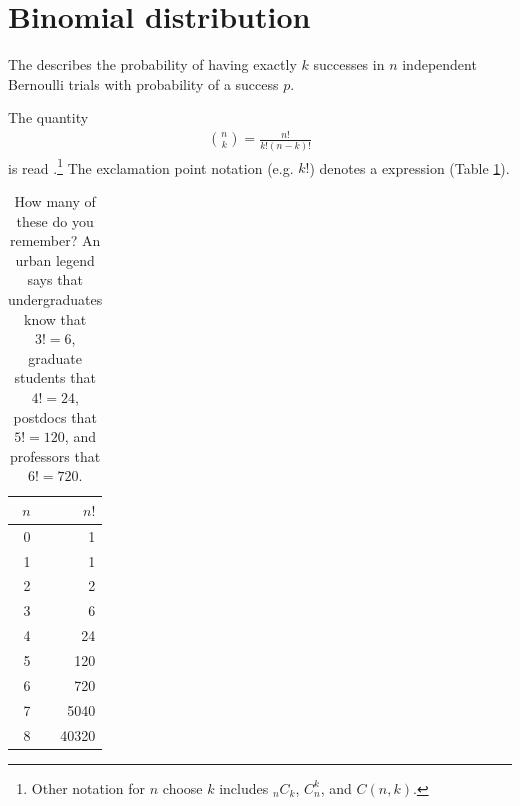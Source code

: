 \section{Binomial distribution}
\label{binomialModel}






The  describes the probability of having exactly $k$ successes in $n$ independent Bernoulli trials with probability of a success $p$.

The quantity
\begin{eqnarray*}
{n\choose k} = \frac{n!}{k!(n-k)!}
\end{eqnarray*}
is read .\footnote{Other notation for $n$ choose $k$ includes $_nC_k$, $C_n^k$, and $C(n,k)$.} The exclamation point notation (e.g. $k!$) denotes a \label{factorialDefinitionInTheBinomialSection} expression (Table \ref{factorialTable}).

\begin{table}
\centering
\begin{tabular}{| r | r |}
\hline
$n$ & $n!$\\
\hline
0&1\\
1&1\\
2&2\\
3&6\\
4&24\\
5&120\\
6&720\\
7&5040\\
8&40320\\
\hline
\end{tabular}
\caption{How many of these do you remember? An urban legend says that undergraduates know that $3!=6$, graduate students that $4!=24$, postdocs that $5!=120$,
and professors that $6!=720$.}\label{factorialTable}
\end{table}

